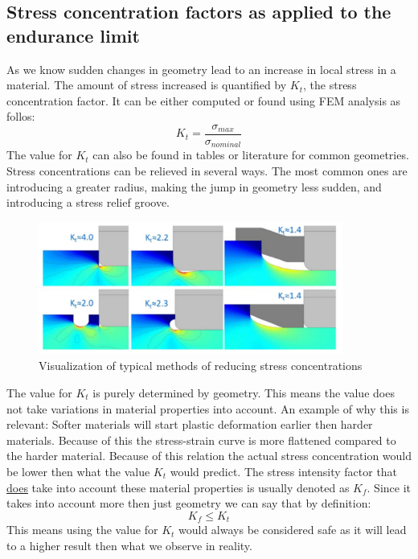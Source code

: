 \documentclass[11pt, a4paper]{article}
\begin{document}
\subsection{Stress concentration factors as applied to the endurance limit}
As we know sudden changes in geometry lead to an increase in local stress in a material. The amount of stress increased is quantified by $K_t$, the stress concentration factor. It can be either computed or found using FEM analysis as follos:
\begin{equation}
  K_t = \frac{\sigma_{max}}{\sigma_{nominal}}
\end{equation}
The value for $K_t$ can also be found in tables or literature for common geometries. Stress concentrations can be relieved in several ways. The most common ones are introducing a greater radius, making the jump in geometry less sudden, and introducing a stress relief groove.
\begin{figure}[h]
  \centerline{\includegraphics[width=100mm]{images/KtVals.png}}
  \caption{Visualization of typical methods of reducing stress concentrations}
\end{figure}
The value for $K_t$ is purely determined by geometry. This means the value does not take variations in material properties into account. An example of why this is relevant: Softer materials will start plastic deformation earlier then harder materials. Because of this the stress-strain curve is more flattened compared to the harder material. Because of this relation the actual stress concentration would be lower then what the value $K_t$ would predict. The stress intensity factor that \underline{does} take into account these material properties is usually denoted as $K_f$. Since it takes into account more then just geometry we can say that by definition:
\begin{equation}
  K_f \leq K_t
\end{equation}
This means using the value for $K_t$ would always be considered safe as it will lead to a higher result then what we observe in reality.
\end{document}
